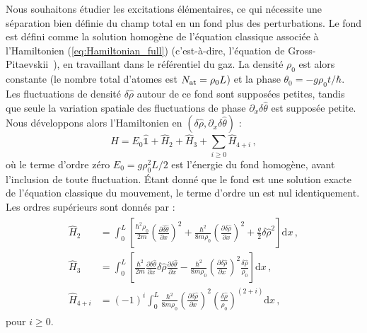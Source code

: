 \documentclass[aps,prd,notitlepage,amsfonts,amssymb,amsmath,nofootinbib,superscriptaddress,longbibliography]{revtex4-2}
\newcommand{\trad}[1]{\textcolor{tradcolor}{#1}}
\begin{document}
\trad{
Nous souhaitons étudier les excitations élémentaires, ce qui nécessite une séparation bien définie du champ total en un fond plus des perturbations. Le fond est défini comme la solution homogène de l'équation classique associée à l'Hamiltonien (\ref{eq:Hamiltonian_full}) (c'est-à-dire, l'équation de Gross-Pitaevskii~\cite{Pitaevskii2016}), en travaillant dans le référentiel du gaz.
La densité \(\rho_0\) est alors constante (le nombre total d'atomes est \(N_{\rm at} = \rho_{0} L\)) et la phase \(\theta_0 = - g \rho_0 t / \hbar\). Les fluctuations de densité \(\delta \hat{\rho}\) autour de ce fond sont supposées petites, tandis que seule la variation spatiale des fluctuations de phase \(\partial_x  \delta \hat{\theta}\) est supposée petite. Nous développons alors l'Hamiltonien en \((\delta \hat{\rho}, \partial_x \delta \hat{\theta})\) :
\begin{equation*}
    \hat{H} = E_{0} \hat{\mathds{1}} + \hat{H}_{2} + \hat{H}_{3} + \sum_{i \geq 0} \hat{H}_{4+i} \, ,
\end{equation*}
où le terme d'ordre zéro \(E_{0} = g\rho_{0}^{2}L/2\) est l'énergie du fond homogène, avant l'inclusion de toute fluctuation. Étant donné que le fond est une solution exacte de l'équation classique du mouvement, le terme d'ordre un est nul identiquement. Les ordres supérieurs sont donnés par :
\begin{align}
    \begin{split}
        \label{def:expressions_pert_hamiltonian}
        \hat{H}_2 & = \int_{0}^{L} \left[ \frac{\hbar^2 \rho_0}{2m}\left(  \frac{\partial \hat{\delta \theta} }{\partial x} \right)^2  + \frac{\hbar^2}{8 m \rho_0 } \left( \frac{\partial \delta \hat{\rho} }{\partial x} \right)^2  +  \frac{g}{2} \delta\hat{\rho}^{2} \right]  \mathrm{d}x  \, , \\
        \hat{H}_{3} & = \int_{0}^{L} \left[ \frac{\hbar^2}{2m} \frac{\partial \delta \hat{\theta} }{\partial x} \delta\hat{\rho} \frac{\partial \delta \hat{\theta} }{\partial x}   - \frac{\hbar^2}{8 m \rho_0} \left( \frac{\partial \delta \hat{\rho} }{\partial x} \right)^2  \frac{\delta \hat{\rho}}{\rho_0} \right]  \mathrm{d}x \, , \\
        \hat{H}_{4 + i} & = (-1)^i \int_{0}^{L} \frac{\hbar^2}{8 m \rho_0} \left( \frac{\partial \delta \hat{\rho}}{\partial x}\right)^2  \left( \frac{\delta \hat{\rho}}{\rho_0} \right) ^{(2+i)}  \mathrm{d}x \,, 
    \end{split}
\end{align}
pour \(i \geq 0\).\\
}
\end{document}

